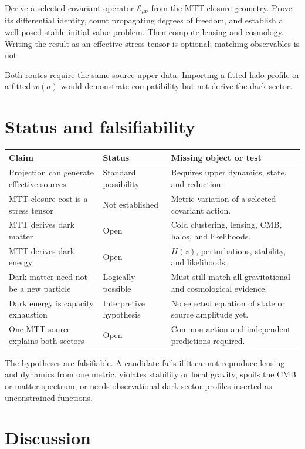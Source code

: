 \documentclass[11pt]{article}
\begin{document}
Derive a selected covariant operator \(\mathcal E_{\mu\nu}\) from the MTT
closure geometry. Prove its differential identity, count propagating
degrees of freedom, and establish a well-posed stable initial-value problem.
Then compute lensing and cosmology. Writing the result as an effective
stress tensor is optional; matching observables is not.

Both routes require the same-source upper data. Importing a fitted halo
profile or a fitted \(w(a)\) would demonstrate compatibility but not derive
the dark sector.

\section{Status and falsifiability}

\begin{center}
\small
\begin{tabularx}{\textwidth}{@{}p{}p{}X@{}}
\toprule
Claim & Status & Missing object or test\\
\midrule
Projection can generate effective sources & Standard possibility &
Requires upper dynamics, state, and reduction.\\
MTT closure cost is a stress tensor & Not established & Metric variation of
a selected covariant action.\\
MTT derives dark matter & Open & Cold clustering, lensing, CMB, halos, and
likelihoods.\\
MTT derives dark energy & Open & \(H(z)\), perturbations, stability, and
likelihoods.\\
Dark matter need not be a new particle & Logically possible & Must still
match all gravitational and cosmological evidence.\\
Dark energy is capacity exhaustion & Interpretive hypothesis & No selected
equation of state or source amplitude yet.\\
One MTT source explains both sectors & Open & Common action and independent
predictions required.\\
\bottomrule
\end{tabularx}
\end{center}

The hypotheses are falsifiable. A candidate fails if it cannot reproduce
lensing and dynamics from one metric, violates stability or local gravity,
spoils the CMB or matter spectrum, or needs observational dark-sector
profiles inserted as unconstrained functions.

\section{Discussion}
\end{document}

